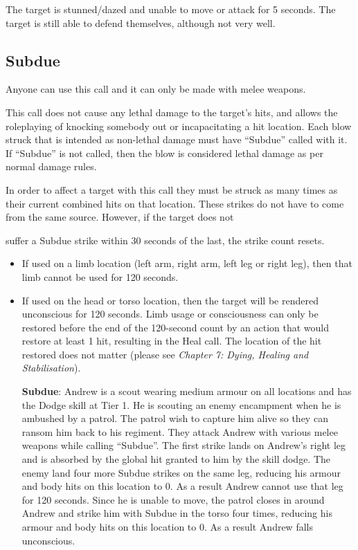 The target is stunned/dazed and unable to move or attack for 5 seconds. The target is still able to defend themselves, although not very well.

\subsection{Subdue}

Anyone can use this call and it can only be made with melee weapons.

This call does not cause any lethal damage to the target's hits, and allows the roleplaying of knocking somebody out or incapacitating a hit location. Each blow struck that is intended as non-lethal damage must have ``Subdue'' called with it. If ``Subdue'' is not called, then the blow is considered lethal damage as per normal damage rules.

In order to affect a target with this call they must be struck as many times as their current combined hits on that location. These strikes do not have to come from the same source. However, if the target does not

suffer a Subdue strike within 30 seconds of the last, the strike count resets.

\begin{itemize}
\item If used on a limb location (left arm, right arm, left leg or right leg), then that limb cannot be used for 120 seconds.

\item If used on the head or torso location, then the target will be rendered unconscious for 120 seconds. Limb usage or consciousness can only be restored before the end of the 120-second count by an action that would restore at least 1 hit, resulting in the Heal call. The location of the hit restored does not matter (please see \textit{Chapter 7: Dying, Healing and Stabilisation}).

\textbf{Subdue}: Andrew is a scout wearing medium armour on all locations and has the Dodge skill at Tier 1. He is scouting an enemy encampment when he is ambushed by a patrol. The patrol wish to capture him alive so they can ransom him back to his regiment. They attack Andrew with various melee weapons while calling ``Subdue''. The first strike lands on Andrew's right leg and is absorbed by the global hit granted to him by the skill dodge. The enemy land four more Subdue strikes on the same leg, reducing his armour and body hits on this location to 0. As a result Andrew cannot use that leg for 120 seconds. Since he is unable to move, the patrol closes in around Andrew and strike him with Subdue in the torso four times, reducing his armour and body hits on this location to 0. As a result Andrew falls unconscious.

\end{itemize}

